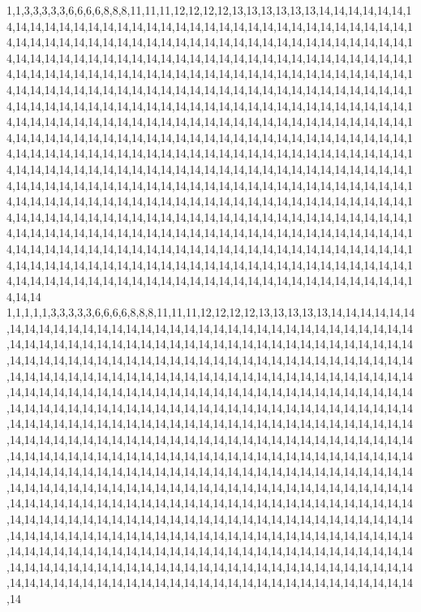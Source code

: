 1,1,3,3,3,3,3,6,6,6,6,8,8,8,11,11,11,12,12,12,12,13,13,13,13,13,13,14,14,14,14,14,14,14,14,14,14,14,14,14,14,14,14,14,14,14,14,14,14,14,14,14,14,14,14,14,14,14,14,14,14,14,14,14,14,14,14,14,14,14,14,14,14,14,14,14,14,14,14,14,14,14,14,14,14,14,14,14,14,14,14,14,14,14,14,14,14,14,14,14,14,14,14,14,14,14,14,14,14,14,14,14,14,14,14,14,14,14,14,14,14,14,14,14,14,14,14,14,14,14,14,14,14,14,14,14,14,14,14,14,14,14,14,14,14,14,14,14,14,14,14,14,14,14,14,14,14,14,14,14,14,14,14,14,14,14,14,14,14,14,14,14,14,14,14,14,14,14,14,14,14,14,14,14,14,14,14,14,14,14,14,14,14,14,14,14,14,14,14,14,14,14,14,14,14,14,14,14,14,14,14,14,14,14,14,14,14,14,14,14,14,14,14,14,14,14,14,14,14,14,14,14,14,14,14,14,14,14,14,14,14,14,14,14,14,14,14,14,14,14,14,14,14,14,14,14,14,14,14,14,14,14,14,14,14,14,14,14,14,14,14,14,14,14,14,14,14,14,14,14,14,14,14,14,14,14,14,14,14,14,14,14,14,14,14,14,14,14,14,14,14,14,14,14,14,14,14,14,14,14,14,14,14,14,14,14,14,14,14,14,14,14,14,14,14,14,14,14,14,14,14,14,14,14,14,14,14,14,14,14,14,14,14,14,14,14,14,14,14,14,14,14,14,14,14,14,14,14,14,14,14,14,14,14,14,14,14,14,14,14,14,14,14,14,14,14,14,14,14,14,14,14,14,14,14,14,14,14,14,14,14,14,14,14,14,14,14,14,14,14,14,14,14,14,14,14,14,14,14,14,14,14,14,14,14,14,14,14,14,14,14,14,14,14,14,14,14,14,14,14,14,14,14,14,14,14,14,14,14,14,14,14,14,14,14,14,14,14,14,14,14,14,14,14,14,14,14,14,14,14,14,14,14,14,14,14,14,14,14,14,14,14,14,14,14,14,14,14,14,14,14,14,14,14,14,14,14,14,14,14,14,14,14,14,14,14,14,14,14,14,14,14,14,14,14,14,14,14,14,14,14,14
1,1,1,1,1,3,3,3,3,3,6,6,6,6,8,8,8,11,11,11,12,12,12,12,13,13,13,13,13,14,14,14,14,14,14,14,14,14,14,14,14,14,14,14,14,14,14,14,14,14,14,14,14,14,14,14,14,14,14,14,14,14,14,14,14,14,14,14,14,14,14,14,14,14,14,14,14,14,14,14,14,14,14,14,14,14,14,14,14,14,14,14,14,14,14,14,14,14,14,14,14,14,14,14,14,14,14,14,14,14,14,14,14,14,14,14,14,14,14,14,14,14,14,14,14,14,14,14,14,14,14,14,14,14,14,14,14,14,14,14,14,14,14,14,14,14,14,14,14,14,14,14,14,14,14,14,14,14,14,14,14,14,14,14,14,14,14,14,14,14,14,14,14,14,14,14,14,14,14,14,14,14,14,14,14,14,14,14,14,14,14,14,14,14,14,14,14,14,14,14,14,14,14,14,14,14,14,14,14,14,14,14,14,14,14,14,14,14,14,14,14,14,14,14,14,14,14,14,14,14,14,14,14,14,14,14,14,14,14,14,14,14,14,14,14,14,14,14,14,14,14,14,14,14,14,14,14,14,14,14,14,14,14,14,14,14,14,14,14,14,14,14,14,14,14,14,14,14,14,14,14,14,14,14,14,14,14,14,14,14,14,14,14,14,14,14,14,14,14,14,14,14,14,14,14,14,14,14,14,14,14,14,14,14,14,14,14,14,14,14,14,14,14,14,14,14,14,14,14,14,14,14,14,14,14,14,14,14,14,14,14,14,14,14,14,14,14,14,14,14,14,14,14,14,14,14,14,14,14,14,14,14,14,14,14,14,14,14,14,14,14,14,14,14,14,14,14,14,14,14,14,14,14,14,14,14,14,14,14,14,14,14,14,14,14,14,14,14,14,14,14,14,14,14,14,14,14,14,14,14,14,14,14,14,14,14,14,14,14,14,14,14,14,14,14,14,14,14,14,14,14,14,14,14,14,14,14,14,14,14,14,14,14,14,14,14,14,14,14,14,14,14,14,14,14,14,14,14,14,14,14,14,14,14,14,14,14,14,14,14,14,14,14,14,14,14,14,14,14,14,14,14,14,14,14,14,14,14,14,14,14,14,14,14,14,14,14,14,14,14,14,14,14,14,14,14,14,14,14,14,14,14
